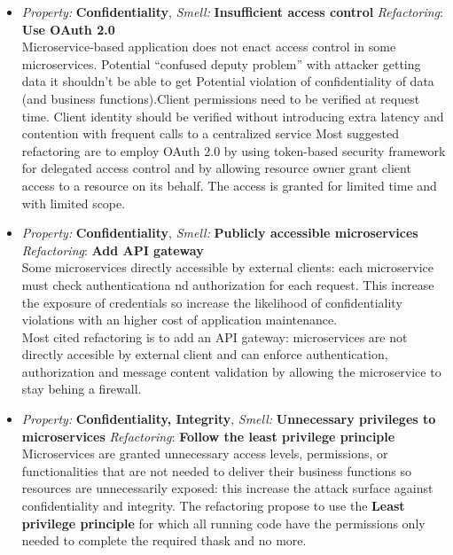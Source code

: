 \documentclass[10pt,a4paper]{report}
\begin{document}
\begin{itemize}
	\item \textit{Property: } \textbf{Confidentiality}, \textit{Smell:} \textbf{Insufficient access control} \textit{Refactoring}: \textbf{Use OAuth 2.0} \\
	 Microservice-based application does not enact access control in some microservices. Potential “confused deputy problem” with attacker getting data it shouldn’t be able to get
	 Potential violation of confidentiality of data (and business functions).Client permissions need to be verified at request time. Client identity should be verified without introducing extra latency and contention with frequent calls to a centralized service
	 Most suggested refactoring are to employ OAuth 2.0
	 by using token-based security framework for delegated access control and by allowing resource owner grant client access to a resource on its behalf. The access is granted for limited time and with limited scope. 
	 
	 \item \textit{Property: } \textbf{Confidentiality}, \textit{Smell:} \textbf{Publicly accessible microservices} \textit{Refactoring}: \textbf{Add API gateway} \\
	 Some microservices directly accessible by external clients: each microservice must check authenticationa nd authorization for each request. This increase the exposure of credentials so increase the likelihood of confidentiality violations with an higher cost of application maintenance.\\
	 Most cited refactoring is to add an API gateway: microservices are not directly accesible by external client and can enforce authentication, authorization and message content validation by allowing the microservice to stay behing a firewall. 
	 
	 \item \textit{Property: } \textbf{Confidentiality, Integrity}, \textit{Smell:} \textbf{Unnecessary privileges to microservices} \textit{Refactoring}: \textbf{Follow the least privilege principle} \\
	 
	 Microservices are granted unnecessary access levels, permissions, or functionalities that are not
	 needed to deliver their business functions so resources are unnecessarily exposed: this increase the attack surface against confidentiality and integrity. The refactoring propose to use the \textbf{Least privilege principle} for which all running code have the permissions only needed to complete the required thask and no more. 
	 

\end{itemize}
\end{document}
